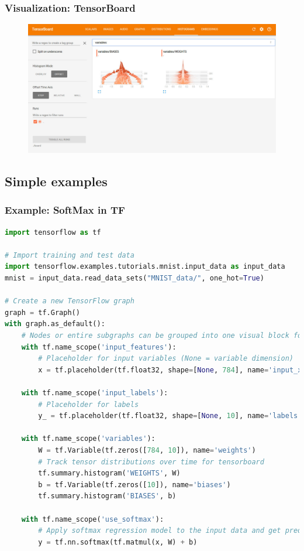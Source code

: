 \begin{frame}
	\MyLogo
	\frametitle{Visualization: TensorBoard}  
	
	\begin{figure}[htbp] 
		\includegraphics[width=\textwidth, height=\textheight]{figures/histograms.pdf} 
	\end{figure}
	
	
\end{frame}

%

\subsection{Simple examples}

\begin{frame}[fragile]
  \MyLogo
  \frametitle{Example: SoftMax in TF}  
 
\begin{lstlisting}[language=python]
import tensorflow as tf

# Import training and test data
import tensorflow.examples.tutorials.mnist.input_data as input_data
mnist = input_data.read_data_sets("MNIST_data/", one_hot=True)

# Create a new TensorFlow graph
graph = tf.Graph()
with graph.as_default():
	# Nodes or entire subgraphs can be grouped into one visual block for tensorboard
	with tf.name_scope('input_features'):
		# Placeholder for input variables (None = variable dimension)
		x = tf.placeholder(tf.float32, shape=[None, 784], name='input_x')
							
	with tf.name_scope('input_labels'):
		# Placeholder for labels
		y_ = tf.placeholder(tf.float32, shape=[None, 10], name='labels')
							
	with tf.name_scope('variables'):
		W = tf.Variable(tf.zeros([784, 10]), name='weights')
		# Track tensor distributions over time for tensorboard
		tf.summary.histogram('WEIGHTS', W)
		b = tf.Variable(tf.zeros([10]), name='biases')
		tf.summary.histogram('BIASES', b)
			
	with tf.name_scope('use_softmax'):
		# Apply softmax regression model to the input data and get prediction y
		y = tf.nn.softmax(tf.matmul(x, W) + b)
\end{lstlisting}

\end{frame}

